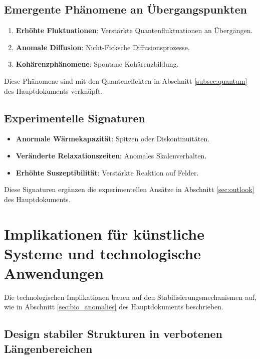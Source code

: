 \documentclass[12pt,a4paper]{article}
\begin{document}
	\subsection{Emergente Phänomene an Übergangspunkten}
	\label{subsec:emergente_phaenomene}
	
	\begin{enumerate}
		\item \textbf{Erhöhte Fluktuationen}: Verstärkte Quantenfluktuationen an Übergängen.
		\item \textbf{Anomale Diffusion}: Nicht-Ficksche Diffusionsprozesse.
		\item \textbf{Kohärenzphänomene}: Spontane Kohärenzbildung.
	\end{enumerate}
	
	Diese Phänomene sind mit den Quanteneffekten in Abschnitt \ref{subsec:quantum} des Hauptdokuments verknüpft.
	
	\subsection{Experimentelle Signaturen}
	\label{subsec:experimentelle_signaturen}
	
	\begin{itemize}
		\item \textbf{Anormale Wärmekapazität}: Spitzen oder Diskontinuitäten.
		\item \textbf{Veränderte Relaxationszeiten}: Anomales Skalenverhalten.
		\item \textbf{Erhöhte Suszeptibilität}: Verstärkte Reaktion auf Felder.
	\end{itemize}
	
	Diese Signaturen ergänzen die experimentellen Ansätze in Abschnitt \ref{sec:outlook} des Hauptdokuments.
	
	\section{Implikationen für künstliche Systeme und technologische Anwendungen}
	\label{sec:technologische_anwendungen}
	
	Die technologischen Implikationen bauen auf den Stabilisierungsmechanismen auf, wie in Abschnitt \ref{sec:bio_anomalies} des Hauptdokuments beschrieben.
	
	\subsection{Design stabiler Strukturen in verbotenen Längenbereichen}
	\label{subsec:design_stabile_strukturen}
	
\end{document}
